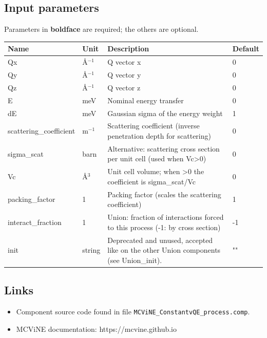 \subsection*{Input parameters}
Parameters in \textbf{boldface} are required; the others are optional.

\begin{longtable}{p{}p{}p{}p{}}
\toprule
\textbf{Name} & \textbf{Unit} & \textbf{Description} & \textbf{Default} \\
\midrule
\endhead
Qx & \AA{}$^{-1}$ & Q vector x & 0 \\
Qy & \AA{}$^{-1}$ & Q vector y & 0 \\
Qz & \AA{}$^{-1}$ & Q vector z & 0 \\
E & meV & Nominal energy transfer & 0 \\
dE & meV & Gaussian sigma of the energy weight & 1 \\
scattering\_coefficient & m$^{-1}$ & Scattering coefficient (inverse penetration depth for scattering) & 0 \\
sigma\_scat & barn & Alternative: scattering cross section per unit cell (used when Vc\textgreater{}0) & 0 \\
Vc & \AA{}$^{3}$ & Unit cell volume; when \textgreater{}0 the coefficient is sigma\_scat/Vc & 0 \\
packing\_factor & 1 & Packing factor (scales the scattering coefficient) & 1 \\
interact\_fraction & 1 & Union: fraction of interactions forced to this process (-1: by cross section) & -1 \\
init & string & Deprecated and unused, accepted like on the other Union components (see Union\_init). & "" \\
\bottomrule
\end{longtable}

\subsection*{Links}
\begin{itemize}
  \item Component source code found in file \texttt{MCViNE\_ConstantvQE\_process.comp}.
  \item MCViNE documentation: https://mcvine.github.io
\end{itemize}
